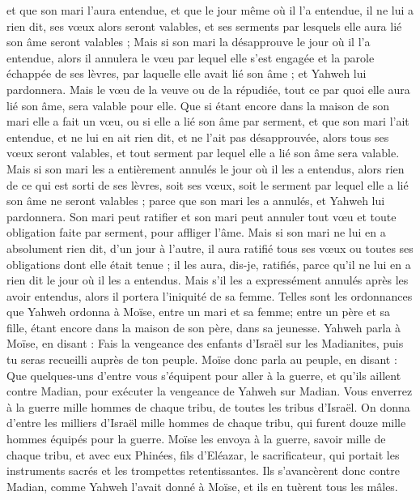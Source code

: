 \begin{multicols}{2}
et que son mari l'aura entendue, et que le jour même où il l'a entendue, il ne lui a rien dit, ses vœux alors seront valables, et ses serments par lesquels elle aura lié son âme seront valables ;
Mais si son mari la désapprouve le jour où il l'a entendue, alors il annulera le vœu par lequel elle s'est engagée et la parole échappée de ses lèvres, par laquelle elle avait lié son âme ; et Yahweh lui pardonnera.
Mais le vœu de la veuve ou de la répudiée, tout ce par quoi elle aura lié son âme, sera valable pour elle.
Que si étant encore dans la maison de son mari elle a fait un vœu, ou si elle a lié son âme par serment,
et que son mari l'ait entendue, et ne lui en ait rien dit, et ne l'ait pas désapprouvée, alors tous ses vœux seront valables, et tout serment par lequel elle a lié son âme sera valable.
Mais si son mari les a entièrement annulés le jour où il les a entendus, alors rien de ce qui est sorti de ses lèvres, soit ses vœux, soit le serment par lequel elle a lié son âme ne seront valables ; parce que son mari les a annulés, et Yahweh lui pardonnera.
Son mari peut ratifier et son mari peut annuler tout vœu et toute obligation faite par serment, pour affliger l'âme.
Mais si son mari ne lui en a absolument rien dit, d’un jour à l’autre, il aura ratifié tous ses vœux ou toutes ses obligations dont elle était tenue ; il les aura, dis-je, ratifiés, parce qu'il ne lui en a rien dit le jour où il les a entendus.
Mais s'il les a expressément annulés après les avoir entendus, alors il portera l'iniquité de sa femme.
Telles sont les ordonnances que Yahweh ordonna à Moïse, entre un mari et sa femme; entre un père et sa fille, étant encore dans la maison de son père, dans sa jeunesse.
\VerseOne{}Yahweh parla à Moïse, en disant :
Fais la vengeance des enfants d'Israël sur les Madianites, puis tu seras recueilli auprès de ton peuple.
Moïse donc parla au peuple, en disant : Que quelques-uns d'entre vous s'équipent pour aller à la guerre, et qu'ils aillent contre Madian, pour exécuter la vengeance de Yahweh sur Madian.
Vous enverrez à la guerre mille hommes de chaque tribu, de toutes les tribus d'Israël.
On donna d'entre les milliers d'Israël mille hommes de chaque tribu, qui furent douze mille hommes équipés pour la guerre.
Moïse les envoya à la guerre, savoir mille de chaque tribu, et avec eux Phinées, fils d'Eléazar, le sacrificateur, qui portait les instruments sacrés et les trompettes retentissantes.
Ils s'avancèrent donc contre Madian, comme Yahweh l'avait donné à Moïse, et ils en tuèrent tous les mâles.

\end{multicols}
